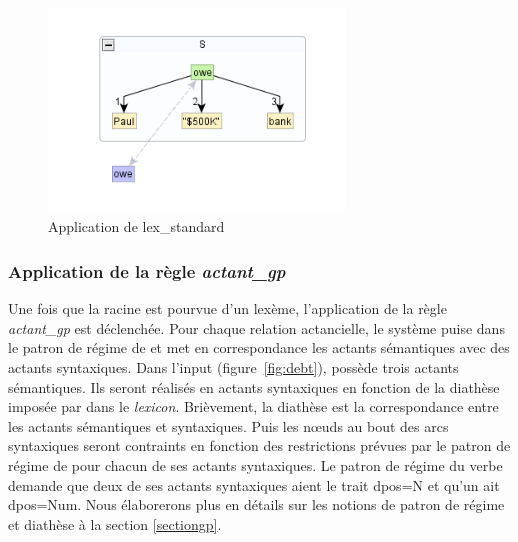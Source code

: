 \begin{figure}[htb]
	\centering
	\includegraphics[width=0.7\textwidth, trim = {0cm 0cm 0cm 0cm},clip]{ch3/figs/lex_standard_root.png}
		\vspace{-0.5cm}
	\caption{Application de lex\_standard}
	\label{fig:lexstand1}
\end{figure}

\subsubsection{Application de la règle \emph{actant\_gp}}
Une fois que la racine est pourvue d'un lexème, l'application de la règle \emph{actant\_gp} est déclenchée. Pour chaque relation actancielle, le système puise dans le patron de régime de  et met en correspondance les actants sémantiques avec des actants syntaxiques. Dans l'input (figure~\ref{fig:debt}),  possède trois actants sémantiques. Ils seront réalisés en actants syntaxiques en fonction de la diathèse imposée par  dans le \emph{lexicon}. Brièvement, la diathèse est la correspondance entre les actants sémantiques et syntaxiques. Puis les n\oe{}uds au bout des arcs syntaxiques seront contraints en fonction des restrictions prévues par le patron de régime de  pour chacun de ses actants syntaxiques. Le patron de régime du verbe demande que deux de ses actants syntaxiques aient le trait dpos=N et qu'un ait dpos=Num. Nous élaborerons plus en détails sur les notions de patron de régime et diathèse à la section \ref{sectiongp}. 

